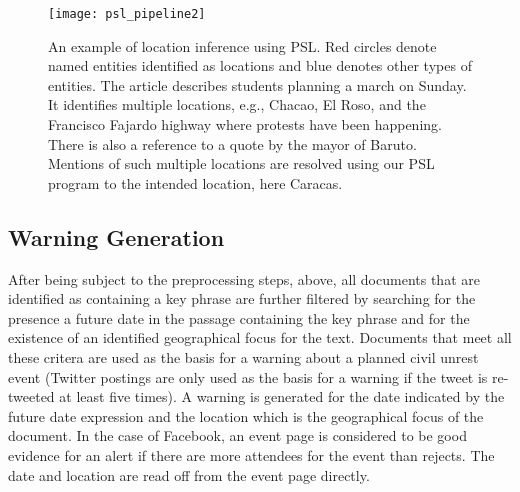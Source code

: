 \begin{figure}
    \texttt{[image: psl\_pipeline2]}
    \vspace{-2em}
    \caption{An example of location inference using PSL. Red circles denote named entities identified as locations and blue denotes other types of entities. The 
article describes students planning a march on Sunday.
It identifies multiple locations, e.g., Chacao, El Roso, and the Francisco Fajardo highway where protests have been happening.
There is also a reference to a quote by the mayor of Baruto.
Mentions of such multiple locations are resolved using our PSL program to the intended location, here Caracas.}
    \label{fig:psl_example}
\end{figure}

%

%
\vspace{-0.5em}
\subsection{Warning Generation}
After being subject to the preprocessing steps, above, all documents
that are identified as containing a key phrase are further filtered by
searching for the presence a future date in the passage containing the
key phrase and for the existence of an identified geographical focus for the text.
Documents that meet all these critera are used as the basis for a warning about a
planned civil unrest event (Twitter postings are only used as the basis for a warning
if the tweet is re-tweeted at least five times). 
A warning is generated for the date indicated by the future date
expression and the location which is the geographical focus of the
document.  
In the case of Facebook, an event page is considered to be good evidence for an alert if
there are more attendees for the event than rejects.  The date and
location are read off from the event page directly.

